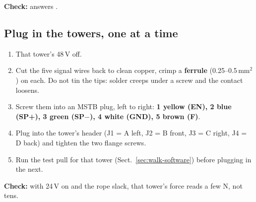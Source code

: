 \textbf{Check:}  answers .

\subsection{Plug in the towers, one at a time}
\begin{enumerate}
\item That tower's 48\,V off.
\item Cut the five signal wires back to clean copper, crimp a \textbf{ferrule} (0.25--0.5\,mm$^2$) on each.
Do not tin the tips: solder creeps under a screw and the contact loosens.
\item Screw them into an MSTB plug, left to right: \textbf{1 yellow (EN), 2 blue (SP+), 3 green (SP$-$),
4 white (GND), 5 brown (F)}.
\item Plug into the tower's header (J1 = A left, J2 = B front, J3 = C right, J4 = D back) and tighten the
two flange screws.
\item Run the test pull for that tower (Sect.~\ref{sec:walk-software}) before plugging in the next.
\end{enumerate}
\textbf{Check:} with 24\,V on and the rope slack, that tower's force reads a few N, not tens.
